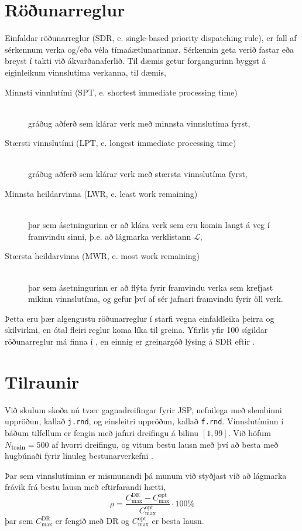 \documentclass[]{article}
\begin{document}
\section{Röðunarreglur}
Einfaldar röðunarreglur (SDR, e. single-based priority dispatching rule), er 
fall af sérkennum verka og/eða véla tímaáætlunarinnar. Sérkennin geta verið 
fastar eða breyst í takti við ákvarðanaferlið. Til dæmis getur forgangurinn 
byggst á eiginleikum vinnslutíma verkanna, til dæmis, 
\begin{description}
    \item[Minnsti vinnlutími (SPT, e. shortest immediate processing time)] 
    \hfill \\ gráðug aðferð sem klárar verk með minnsta vinnslutíma fyrst, 
    \item[Stærsti vinnslutími (LPT, e. longest immediate processing time)] 
    \hfill \\ gráðug aðferð sem klárar verk með stærsta vinnslutíma fyrst, 
    \item[Minnsta heildarvinna (LWR, e. least work remaining)] \hfill \\
    þar sem ásetningurinn er að klára verk sem eru komin langt á veg í 
    framvindu sinni, þ.e. að lágmarka verklistann $\mathcal{L}$,
    \item[Stærsta heildarvinna (MWR, e. most work remaining)] \hfill \\
    þar sem ásetningurinn er að flýta fyrir framvindu verka sem krefjast mikinn 
    vinnslutíma, og gefur því af sér jafnari framvindu fyrir öll verk.
\end{description}
Þetta eru þær algengustu röðunarreglur í starfi vegna einfaldleika þeirra og 
skilvirkni, en ótal fleiri reglur koma líka til greina. Yfirlit yfir 100 
sígildar röðunarreglur má finna í \citet{Panwalkar77}, en einnig er greinargóð 
lýsing á SDR eftir \citet{Haupt89}. 

\section{Tilraunir}
Við skulum skoða nú tvær gagnadreifingar fyrir JSP, nefnilega með slembinni 
uppröðun, kallað \texttt{j.rnd}, og einsleitri uppröðun, kallað \texttt{f.rnd}. 
Vinnslutíminn í báðum tilfellum er fengin með jafnri dreifingu á bilinu 
$[1,99]$.
Við höfum $N_{\textbf{train}}=500$ af hvorri dreifingu, og vitum bestu lausn 
með því að besta með hugbúnaði fyrir línuleg bestunarverkefni \citep{gurobi}. 

Þar sem vinnslutíminn er mismunandi þá munum við styðjast við að lágmarka 
frávik frá bestu lausn með eftirfarandi hætti, 
\begin{equation}
\rho=\frac{C_{\max}^{\text{DR}}-C_{\max}^{\text{opt}}}{C_{\max}^{\text{opt}}}
\cdot 100\%
\end{equation}
þar sem $C_{\max}^{\text{DR}}$ er fengið með DR og $C_{\max}^{\text{opt}}$ er 
besta lausn. 
\end{document}
